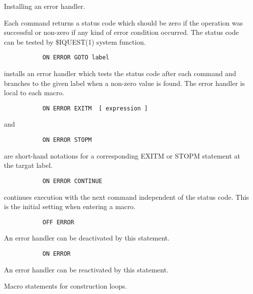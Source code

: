 \ENDCMD


   \par
Installing an error handler.  

   \par
Each command returns a status code which should be zero if the operation 
   was successful or non-zero if any kind of error condition occurred.  The 
   status code can be tested by \$IQUEST(1) system function.  

\begin{verbatim}
           ON ERROR GOTO label
\end{verbatim}
\ENDVERB
   \par
installs an error handler which tests the status code after each command 
   and branches to the given label when a non-zero value is found.  The error 
   handler is local to each macro.  

\begin{verbatim}
           ON ERROR EXITM  [ expression ]
\end{verbatim}
   \par
and 
\begin{verbatim}
           ON ERROR STOPM
\end{verbatim}
\ENDVERB
   \par
are short-hand notations for a corresponding EXITM or STOPM statement at 
   the targat label.  

\begin{verbatim}
           ON ERROR CONTINUE
\end{verbatim}
\ENDVERB
   \par
continues execution with the next command independent of the status code.  
   This is the initial setting when entering a macro.  

\begin{verbatim}
           OFF ERROR
\end{verbatim}
\ENDVERB
   \par
An error handler can be deactivated by this statement.  

\begin{verbatim}
           ON ERROR
\end{verbatim}
\ENDVERB
   \par
An error handler can be reactivated by this statement.  

\ENDCMD
{}
\ifMENUtext
   \par
Macro statements for construction loops.  


